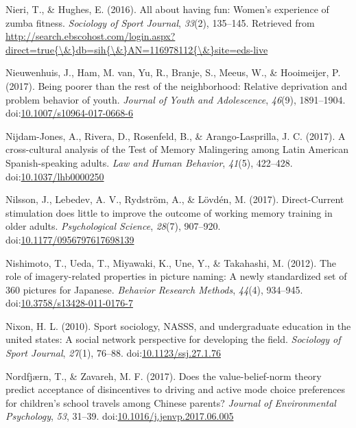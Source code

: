 \documentclass[english,man]{apa6}
\begin{document}
\hypertarget{ref-Nieri2016}{}
Nieri, T., \& Hughes, E. (2016). All about having fun: Women's
experience of zumba fitness. \emph{Sociology of Sport Journal},
\emph{33}(2), 135--145. Retrieved from
\href{http://search.ebscohost.com/login.aspx?direct=true\%7B/\&\%7Ddb=sih\%7B/\&\%7DAN=116978112\%7B/\&\%7Dsite=eds-live}{http://search.ebscohost.com/login.aspx?direct=true\{\textbackslash{}\&\}db=sih\{\textbackslash{}\&\}AN=116978112\{\textbackslash{}\&\}site=eds-live}

\hypertarget{ref-Nieuwenhuis2017}{}
Nieuwenhuis, J., Ham, M. van, Yu, R., Branje, S., Meeus, W., \&
Hooimeijer, P. (2017). Being poorer than the rest of the neighborhood:
Relative deprivation and problem behavior of youth. \emph{Journal of
Youth and Adolescence}, \emph{46}(9), 1891--1904.
doi:\href{https://doi.org/10.1007/s10964-017-0668-6}{10.1007/s10964-017-0668-6}

\hypertarget{ref-Nijdam-Jones2017}{}
Nijdam-Jones, A., Rivera, D., Rosenfeld, B., \& Arango-Lasprilla, J. C.
(2017). A cross-cultural analysis of the Test of Memory Malingering
among Latin American Spanish-speaking adults. \emph{Law and Human
Behavior}, \emph{41}(5), 422--428.
doi:\href{https://doi.org/10.1037/lhb0000250}{10.1037/lhb0000250}

\hypertarget{ref-Nilsson2017}{}
Nilsson, J., Lebedev, A. V., Rydström, A., \& Lövdén, M. (2017).
Direct-Current stimulation does little to improve the outcome of working
memory training in older adults. \emph{Psychological Science},
\emph{28}(7), 907--920.
doi:\href{https://doi.org/10.1177/0956797617698139}{10.1177/0956797617698139}

\hypertarget{ref-Nishimoto2012}{}
Nishimoto, T., Ueda, T., Miyawaki, K., Une, Y., \& Takahashi, M. (2012).
The role of imagery-related properties in picture naming: A newly
standardized set of 360 pictures for Japanese. \emph{Behavior Research
Methods}, \emph{44}(4), 934--945.
doi:\href{https://doi.org/10.3758/s13428-011-0176-7}{10.3758/s13428-011-0176-7}

\hypertarget{ref-Nixon2010}{}
Nixon, H. L. (2010). Sport sociology, NASSS, and undergraduate education
in the united states: A social network perspective for developing the
field. \emph{Sociology of Sport Journal}, \emph{27}(1), 76--88.
doi:\href{https://doi.org/10.1123/ssj.27.1.76}{10.1123/ssj.27.1.76}

\hypertarget{ref-Nordfjuxe6rn2017}{}
Nordfjærn, T., \& Zavareh, M. F. (2017). Does the value-belief-norm
theory predict acceptance of disincentives to driving and active mode
choice preferences for children's school travels among Chinese parents?
\emph{Journal of Environmental Psychology}, \emph{53}, 31--39.
doi:\href{https://doi.org/10.1016/j.jenvp.2017.06.005}{10.1016/j.jenvp.2017.06.005}
\end{document}
